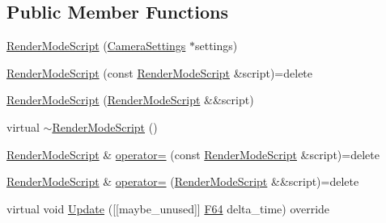 \subsection*{Public Member Functions}
\begin{DoxyCompactItemize}
\item 
\hyperlink{classmage_1_1script_1_1_render_mode_script_ad3123239ae49edd88d684da200c4fa8e}{Render\+Mode\+Script} (\hyperlink{classmage_1_1_camera_settings}{Camera\+Settings} $\ast$settings)
\item 
\hyperlink{classmage_1_1script_1_1_render_mode_script_a004115fb61825ab96ae569a908fadcc0}{Render\+Mode\+Script} (const \hyperlink{classmage_1_1script_1_1_render_mode_script}{Render\+Mode\+Script} \&script)=delete
\item 
\hyperlink{classmage_1_1script_1_1_render_mode_script_abde2e32b98a89d66370fbb57454d02ce}{Render\+Mode\+Script} (\hyperlink{classmage_1_1script_1_1_render_mode_script}{Render\+Mode\+Script} \&\&script)
\item 
virtual \hyperlink{classmage_1_1script_1_1_render_mode_script_adef264fb8660a5e8d2504fdfa07252e5}{$\sim$\+Render\+Mode\+Script} ()
\item 
\hyperlink{classmage_1_1script_1_1_render_mode_script}{Render\+Mode\+Script} \& \hyperlink{classmage_1_1script_1_1_render_mode_script_af735235c25858295c4e5e23586b19f20}{operator=} (const \hyperlink{classmage_1_1script_1_1_render_mode_script}{Render\+Mode\+Script} \&script)=delete
\item 
\hyperlink{classmage_1_1script_1_1_render_mode_script}{Render\+Mode\+Script} \& \hyperlink{classmage_1_1script_1_1_render_mode_script_a75affa0757f3ad8603d6437e48732ab4}{operator=} (\hyperlink{classmage_1_1script_1_1_render_mode_script}{Render\+Mode\+Script} \&\&script)=delete
\item 
virtual void \hyperlink{classmage_1_1script_1_1_render_mode_script_afe0bfc54c414c2697dfd2babaccf3b51}{Update} (\mbox{[}\mbox{[}maybe\+\_\+unused\mbox{]}\mbox{]} \hyperlink{namespacemage_ad26233bbec640deda836e572c1a23708}{F64} delta\+\_\+time) override
\end{DoxyCompactItemize}
